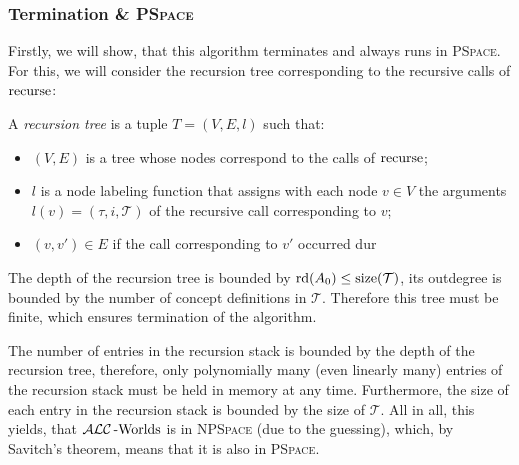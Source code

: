 \subsubsection{Termination \& \textsc{PSpace}}
Firstly, we will show, that this algorithm terminates and always runs in \textsc{PSpace}.
For this, we will consider the recursion tree corresponding to the recursive calls of $\operatorname{\text{recurse}}$:

\begin{definition*}
	A \textit{recursion tree} is a tuple $T = (V, E, l)$ such that:
	\begin{itemize}
		\item $(V,E)$ is a tree whose nodes correspond to the calls of $\operatorname{\text{recurse}}$;
		\item $l$ is a node labeling function that assigns with each node $v \in V$ 
			the arguments $l(v) = (\tau, i, \mathcal{T})$ of the recursive call corresponding to $v$;
		\item $(v, v') \in E$ if the call corresponding to $v'$ occurred dur
	\end{itemize}
\end{definition*}

The depth of the recursion tree is bounded by $\operatorname{\text{rd}}(A_0) \leq \operatorname{\text{size}}(\mathcal{T})$,
its outdegree is bounded by the number of concept definitions in $\mathcal{T}$.
Therefore this tree must be finite, which ensures termination of the algorithm.

The number of entries in the recursion stack is bounded by the depth of the recursion tree,
therefore, only polynomially many (even linearly many) entries of the recursion stack
must be held in memory at any time.
Furthermore, the size of each entry in the recursion stack is bounded by the size of $\mathcal{T}$.
All in all, this yields, that  $\mathcal{ALC}\operatorname{\text{-Worlds}}$ is in \textsc{NPSpace} (due to the guessing),
which, by Savitch's theorem, means that it is also in  \textsc{PSpace}.

